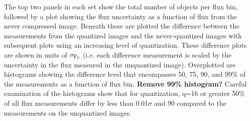 The top two panels in each set show the total number of objects per flux bin, followed by a plot 
showing the flux uncertainty as a function of flux from the never compressed image.  Beneath these 
are plotted the difference between the measurements from the quantized images and the never-quantized 
images with subsequent plots using an increasing level of quantization.  These difference 
plots are shown in units of $\sigma_{\rm F_0}$ (i.e. each difference measurement is scaled by the
uncertainty in the flux measured in the unquantized image).  Overplotted are histograms showing the 
difference level that encompasses 50, 75, 90, and 99\% of the measurements as a function of flux bin.
{\bf Remove 99\% histogram?}
Careful examination of the histograms show that for quantization, q=16 or greater 50\% of all 
flux measurements differ by less than 0.01$\sigma$ and 90%
compared to the measurements on the unquantized images.

